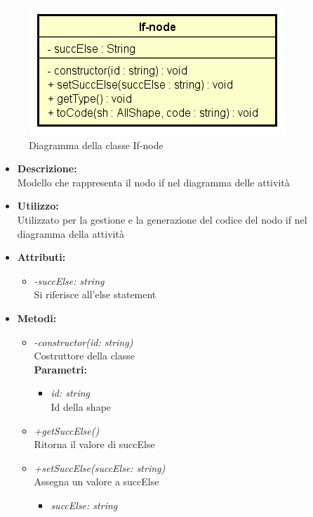 \begin{figure}[h!]
	\centering
	\includegraphics[scale=0.8]{res/sections/SpecificaFrontEnd/Services/Disegnetti/if-node.png}
	\caption{Diagramma della classe If-node}
\end{figure}

\begin{itemize}
	\item \textbf{Descrizione:}\\
	Modello che rappresenta il nodo if nel diagramma delle attività
	\item \textbf{Utilizzo:}\\
	Utilizzato per la gestione e la generazione del codice del nodo if nel diagramma della attività
	\item \textbf{Attributi:}
		\begin{itemize}
			\item \emph{-succElse: string}\\
			Si riferisce all'else statement
		\end{itemize}
	\item \textbf{Metodi:}
		\begin{itemize}
			\item \emph{-constructor(id: string)}\\
    		Costruttore della classe\\
    		\textbf{Parametri:}
    		\begin{itemize}
    			\item \emph{id: string}\\
    			Id della shape
    		\end{itemize}
    		\item \emph{+getSuccElse()}\\
    		Ritorna il valore di succElse
    		\item \emph{+setSuccElse(succElse: string)}\\
    		Assegna un valore a succElse\\
    		\begin{itemize}
    			\item \emph{succElse: string}\\

\end{itemize}
\end{itemize}
\end{itemize}
